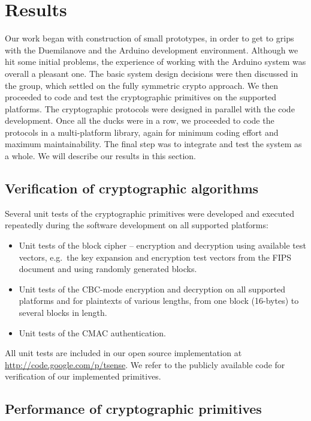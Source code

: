 
\chapter{Results}
\label{sec:results}

Our work began with construction of small prototypes, in order to get to grips with the Duemilanove and the Arduino development environment. Although we hit some initial problems, the experience of working with the Arduino system was overall a pleasant one. The basic system design decisions were then discussed in the group, which settled on the fully symmetric crypto approach. We then proceeded to code and test the cryptographic primitives on the supported platforms. The cryptographic protocols were designed in parallel with the code development. Once all the ducks were in a row, we proceeded to code the protocols in a multi-platform library, again for minimum coding effort and maximum maintainability. The final step was to integrate and test the system as a whole. We will describe our results in this section.

\section{Verification of cryptographic algorithms}

Several unit tests of the cryptographic primitives were developed and executed repeatedly during the software development on all supported platforms:
\begin{itemize}
\item Unit tests of the block cipher -- encryption and decryption using available test vectors, e.g.\ the key expansion and encryption test vectors from the FIPS document and using randomly generated blocks.
\item Unit tests of the CBC-mode encryption and decryption on all supported platforms and for plaintexts of various lengths, from one block (16-bytes) to several blocks in length.
\item Unit tests of the CMAC authentication. 
\end{itemize}
All unit tests are included in our open source implementation at \url{http://code.google.com/p/tsense}. We refer to the publicly available code for verification of our implemented primitives.

\section{Performance of cryptographic primitives}


